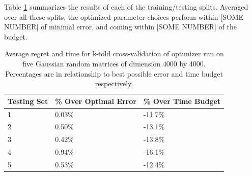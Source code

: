 Table \ref{fig:4kCrossTable} summarizes the results of each of the 
training/testing splits. Averaged over all these splits, the optimized 
parameter choices perform within [SOME NUMBER] of minimal error, 
and coming within [SOME NUMBER] of the budget.

\begin{table}
\label{fig:4kCrossTable}
\begin{center}
    \begin{tabular}{| p{2.2cm} | p{2.2cm} | p{2.2cm} |}
    \hline
    Testing Set & \% Over Optimal Error & \% Over Time Budget \\ \hline
    1 & 0.03\% & -11.7\% \\ \hline
    2 & 0.50\% & -13.1\% \\ \hline
    3 & 0.42\% & -13.8\% \\ \hline
    4 & 0.94\% & -16.1\% \\ \hline
    5 & 0.53\% & -12.4\% \\ \hline
    \end{tabular}
\end{center}
\caption{Average regret and time for k-fold cross-validation of optimizer run on five Gaussian random matrices of dimension 4000 by 4000. Percentages are in relationship to best possible error and time budget respectively.}
\end{table}

